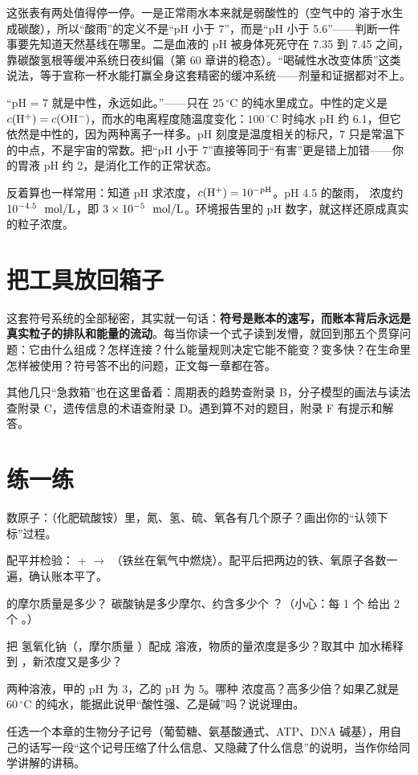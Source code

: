 这张表有两处值得停一停。一是正常雨水本来就是弱酸性的（空气中的  溶于水生成碳酸），所以“酸雨”的定义不是“pH 小于 7”，而是“pH 小于 5.6”——判断一件事要先知道天然基线在哪里。二是血液的 pH 被身体死死守在 7.35 到 7.45 之间，靠碳酸氢根等缓冲系统日夜纠偏（第 60 章讲的稳态）。“喝碱性水改变体质”这类说法，等于宣称一杯水能打赢全身这套精密的缓冲系统——剂量和证据都对不上。

\begin{wuqu}
“pH = 7 就是中性，永远如此。”——只在 $25\,^{\circ}\mathrm{C}$ 的纯水里成立。中性的定义是 $c(\mathrm{H^+}) = c(\mathrm{OH^-})$，而水的电离程度随温度变化：$100\,^{\circ}\mathrm{C}$ 时纯水 pH 约 6.1，但它依然是中性的，因为两种离子一样多。pH 刻度是温度相关的标尺，7 只是常温下的中点，不是宇宙的常数。把“pH 小于 7”直接等同于“有害”更是错上加错——你的胃液 pH 约 2，是消化工作的正常状态。
\end{wuqu}

反着算也一样常用：知道 pH 求浓度，$c(\mathrm{H^+}) = 10^{-\mathrm{pH}}$。pH 4.5 的酸雨， 浓度约 $10^{-4.5}\ \ud{}{mol/L}$，即 $3\times10^{-5}\ \ud{}{mol/L}$。环境报告里的 pH 数字，就这样还原成真实的粒子浓度。

\section{把工具放回箱子}

这套符号系统的全部秘密，其实就一句话：\textbf{符号是账本的速写，而账本背后永远是真实粒子的排队和能量的流动}。每当你读一个式子读到发懵，就回到那五个贯穿问题：它由什么组成？怎样连接？什么能量规则决定它能不能变？变多快？在生命里怎样被使用？符号答不出的问题，正文每一章都在答。

其他几只“急救箱”也在这里备着：周期表的趋势查附录 B，分子模型的画法与读法查附录 C，遗传信息的术语查附录 D。遇到算不对的题目，附录 F 有提示和解答。

\section*{练一练}

\begin{sikaoti}
\item 数原子：（化肥硫酸铵）里，氮、氢、硫、氧各有几个原子？画出你的“认领下标”过程。
\item 配平并检验： +  $\rightarrow$ （铁丝在氧气中燃烧）。配平后把两边的铁、氧原子各数一遍，确认账本平了。
\item {} 的摩尔质量是多少？ 碳酸钠是多少摩尔、约含多少个 ？（小心：每 1 个  给出 2 个 。）
\item 把  氢氧化钠（，摩尔质量 ）配成  溶液，物质的量浓度是多少？取其中  加水稀释到 ，新浓度又是多少？
\item 两种溶液，甲的 pH 为 3，乙的 pH 为 5。哪种  浓度高？高多少倍？如果乙就是 $60\,^{\circ}\mathrm{C}$ 的纯水，能据此说甲“酸性强、乙是碱”吗？说说理由。
\item 任选一个本章的生物分子记号（葡萄糖、氨基酸通式、ATP、DNA 碱基），用自己的话写一段“这个记号压缩了什么信息、又隐藏了什么信息”的说明，当作你给同学讲解的讲稿。
\end{sikaoti}
